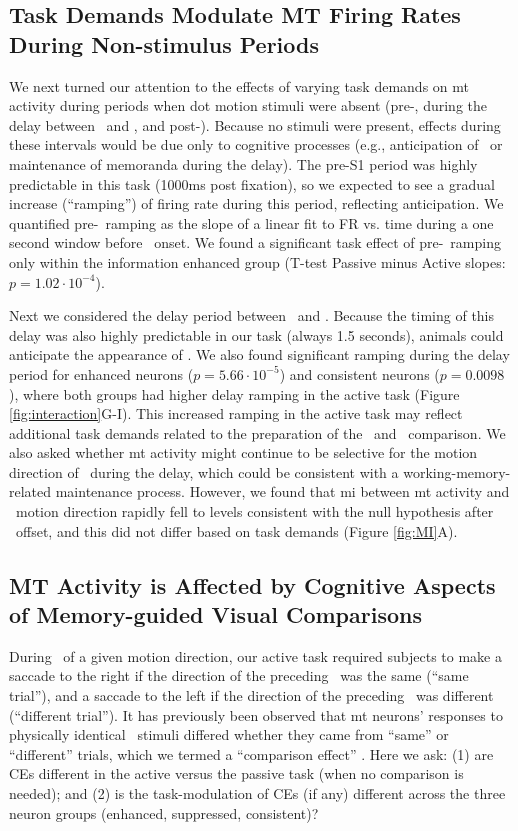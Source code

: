 \subsection*{Task Demands Modulate MT Firing Rates During Non-stimulus Periods}
We next turned our attention to the effects of varying task demands on \gls{mt} activity during periods when dot motion stimuli were absent (pre-\sample, during the delay between \sample\ and \test, and post-\test). Because no stimuli were present, effects during these intervals would be due only to cognitive processes (e.g., anticipation of \sample\ or maintenance of memoranda during the delay).
The pre-S1 period was highly predictable in this task (1000ms post fixation), so we expected to see a gradual increase (``ramping'') of firing rate during this period, reflecting anticipation. We quantified pre-\sample\ ramping as the slope of a linear fit to FR vs. time during a one second window before \sample\ onset. We found a significant task effect of pre-\sample\ ramping only within the information enhanced group (T-test Passive minus Active slopes: $p=1.02\cdot 10^{-4}$).

Next we considered the delay period between \sample\ and \test. Because the timing of this delay was also highly predictable in our task (always 1.5 seconds), animals could anticipate the appearance of \test. We also found significant ramping during the delay period for enhanced neurons ($p=5.66\cdot10^{-5}$) and consistent neurons ($p=0.0098$), where both groups had higher delay ramping in the active task (Figure \ref{fig:interaction}G-I).  This increased ramping in the active task may reflect additional task demands related to the preparation of the \sample\ and \test\ comparison.
We also asked whether \gls{mt} activity might continue to be selective for the motion direction of \sample\ during the delay, which could be consistent with a working-memory-related maintenance process. However, we found that \gls{mi} between \gls{mt} activity and \sample\ motion direction rapidly fell to levels consistent with the null hypothesis after \sample\ offset, and this did not differ based on task demands (Figure \ref{fig:MI}A).

\subsection*{MT Activity is Affected by Cognitive Aspects of Memory-guided Visual Comparisons}
During \test\ of a given motion direction, our active task required subjects to make a saccade to the right if the direction of the preceding \sample\ was the same (``same trial''), and a saccade to the left if the direction of the preceding \sample\ was different (``different trial'').
It has previously been observed that \gls{mt} neurons' responses to physically identical \test\ stimuli differed whether they came from ``same'' or ``different'' trials, which we termed a ``comparison effect'' \parencite{Lui2011,Zaksas2006}. 
Here we ask: (1) are CEs different in the active versus the passive task (when no comparison is needed); and (2) is the task-modulation of CEs (if any) different across the three neuron groups (enhanced, suppressed, consistent)?

